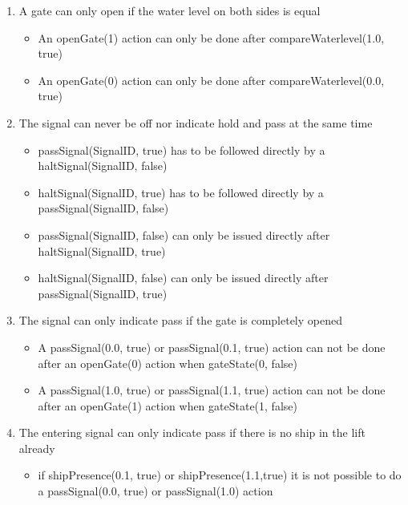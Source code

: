 \begin{enumerate}
	\item A gate can only open if the water level on both sides is equal
	\begin{itemize}
		\item An openGate(1) action can only be done after compareWaterlevel(1.0, true)
		\item An openGate(0) action can only be done after compareWaterlevel(0.0, true)
	\end{itemize}
	\item The signal can never be off nor indicate hold and pass at the same time
		\begin{itemize}
			\item passSignal(SignalID, true) has to be followed directly by a haltSignal(SignalID, false)
			\item haltSignal(SignalID, true) has to be followed directly by a passSignal(SignalID, false)
			\item passSignal(SignalID, false) can only be issued directly after haltSignal(SignalID, true)
			\item haltSignal(SignalID, false) can only be issued directly after passSignal(SignalID, true)
		\end{itemize}
		\item The signal can only indicate pass if the gate is completely opened
		\begin{itemize}
			\item A passSignal(0.0, true) or passSignal(0.1, true) action can not be done after an openGate(0) action when gateState(0, false)
			\item A passSignal(1.0, true) or passSignal(1.1, true) action can not be done after an openGate(1) action when gateState(1, false)
		\end{itemize}
		\item The entering signal can only indicate pass if there is no ship in the lift already
		\begin{itemize}
			\item if shipPresence(0.1, true) or shipPresence(1.1,true) it is not possible to do a passSignal(0.0, true) or passSignal(1.0) action 
		\end{itemize}
	\end{enumerate}

